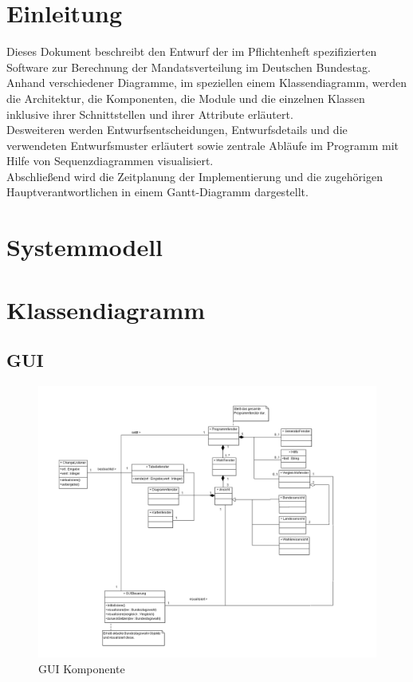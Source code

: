 \documentclass[12pt,a4paper,titlepage]{article}
\begin{document}
\section{Einleitung}
Dieses Dokument beschreibt den Entwurf der im Pflichtenheft spezifizierten Software zur Berechnung der Mandatsverteilung im Deutschen Bundestag.\\
Anhand verschiedener Diagramme, im speziellen einem Klassendiagramm, werden die Architektur, die Komponenten, die Module und die einzelnen Klassen inklusive ihrer Schnittstellen und ihrer Attribute erläutert.\\
Desweiteren werden Entwurfsentscheidungen, Entwurfsdetails und die verwendeten Entwurfsmuster erläutert sowie zentrale Abläufe im Programm mit Hilfe von Sequenzdiagrammen visualisiert.\\
Abschließend wird die Zeitplanung der Implementierung und die zugehörigen Hauptverantwortlichen in einem Gantt-Diagramm dargestellt.    

\section{Systemmodell}
\section{Klassendiagramm}
\subsection{GUI}
\begin{figure}[!ht]
\includegraphics[scale=0.4]{GUI-Abschnitt.png} \caption{GUI Komponente} 
\end{figure}
\end{document}
